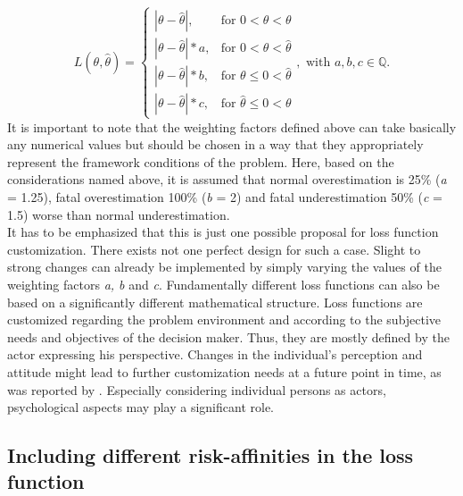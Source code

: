 		\begin{equation}\label{eq:LF_final}
		L(\theta,\hat{\theta}) =
		\begin{cases}
		|\theta - \hat{\theta}|, & \text{for } 0<\hat{\theta}<\theta  \\
		|\theta-\hat{\theta}|*a, & \text{for } 0<\theta<\hat{\theta} \\
		|\theta-\hat{\theta}|*b, & \text{for } \theta\leq0<\hat{\theta} \\
		|\theta-\hat{\theta}|*c, & \text{for } \hat{\theta}\leq0<\theta 
		\end{cases},
		\text{ with } a,b,c \in \mathbb{Q}.
		\end{equation}  
		It is important to note that the weighting factors defined above can take basically any numerical values but should be chosen in a way that they appropriately represent the framework conditions of the problem. Here, based on the considerations named above, it is assumed that normal overestimation is 25\% (\textit{a} = 1.25), fatal overestimation 100\% (\textit{b} = 2) and fatal underestimation 50\% (\textit{c} = 1.5) worse than normal underestimation. \\		
		It has to be emphasized that this is just one possible proposal for loss function customization. There exists not one perfect design for such a case. Slight to strong changes can already be implemented by simply varying the values of the weighting factors \textit{a, b} and \textit{c}. Fundamentally different loss functions can also be based on a significantly different mathematical structure. Loss functions are customized regarding the problem environment and according to the subjective needs and objectives of the decision maker. Thus, they are mostly defined by the actor expressing his perspective. Changes in the individual's perception and attitude might lead to further customization needs at a future point in time, as was reported by \citet{hennig2007}. Especially considering individual persons as actors, psychological aspects may play a significant role.
		
		\subsection{Including different risk-affinities in the loss function}
		
